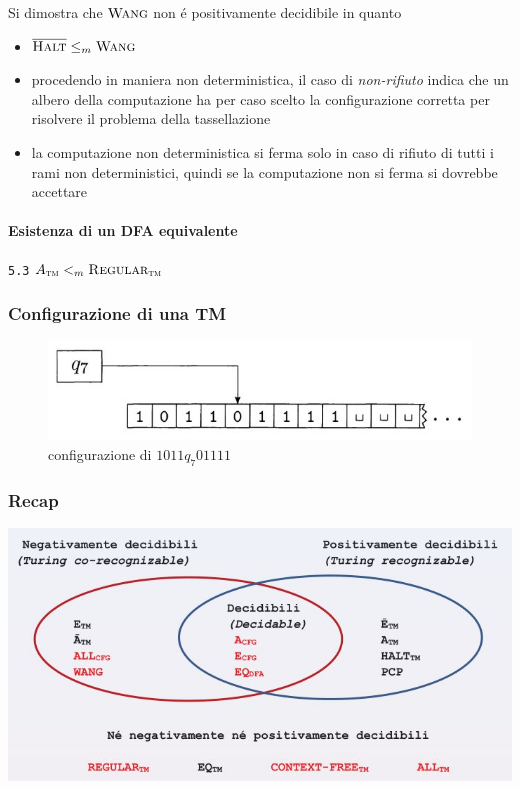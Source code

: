 \documentclass[
                        12pt, %
                        a4paper, %
                        oneside, %
                        headinclude,footinclude, %
                        BCOR5mm, %
                  ]{scrartcl}
\begin{document}
Si dimostra che \(\textsc{Wang}\) non é positivamente decidibile in quanto
\begin{itemize}
\item \(\overline{\textsc{Halt}} \le_m \textsc{Wang}\)
\item procedendo in maniera non deterministica, il caso di \emph{non-rifiuto} indica che un albero della computazione ha per caso scelto la configurazione corretta per risolvere il problema della tassellazione
\item la computazione non deterministica si ferma solo in caso di rifiuto di tutti i rami non deterministici, quindi se la computazione non si ferma si dovrebbe accettare
\end{itemize}

\paragraph{Esistenza di un DFA equivalente}
\label{sec:org572a35f}
\texttt{5.3}
\(A_{\textsc{tm}} <_m\textsc{Regular}_{\textsc{tm}}\)
\subsubsection{Configurazione di una TM}
\label{sec:org38b686c}
\begin{figure}[htbp]
\centering
\includegraphics[width=.9\linewidth]{../media/img/tm-configuration.jpg}
\caption{configurazione di \(1011 q_{7} 01111\)}
\end{figure}
\subsubsection{Recap}
\label{sec:org6c89a9e}
\begin{center}
\includegraphics[width=.9\linewidth]{../media/img/decidability.jpg}
\end{center}
\end{document}
